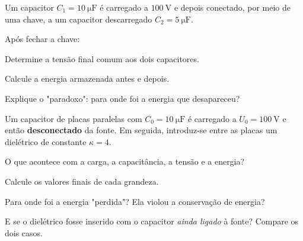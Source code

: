 \begin{questao}[3]{}

Um capacitor $C_1 = \SI{10}{\micro\farad}$ é carregado a $\SI{100}{\volt}$ e
depois conectado, por meio de uma chave, a um capacitor descarregado
$C_2 = \SI{5}{\micro\farad}$.


Após fechar a chave:
\begin{itensq}
\item Determine a tensão final comum aos dois capacitores.
\item Calcule a energia armazenada antes e depois.
\item Explique o "paradoxo": para onde foi a energia que desapareceu?
\end{itensq}


\end{questao}
\begin{questao}[3]{}

Um capacitor de placas paralelas com $C_0 = \SI{10}{\micro\farad}$ é carregado a
$U_0 = \SI{100}{\volt}$ e então \textbf{desconectado} da fonte. Em seguida,
introduz-se entre as placas um dielétrico de constante $\kappa = 4$.
\begin{itensq}
\item O que acontece com a carga, a capacitância, a tensão e a energia?
\item Calcule os valores finais de cada grandeza.
\item Para onde foi a energia "perdida"? Ela violou a conservação de energia?
\item E se o dielétrico fosse inserido com o capacitor \emph{ainda ligado} à
      fonte? Compare os dois casos.
\end{itensq}


\end{questao}

